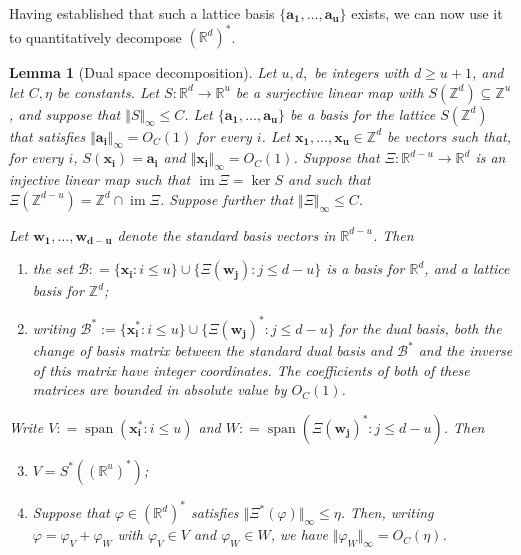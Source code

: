 \documentclass[12pt,a4paper,twoside,reqno]{amsart}
\newtheorem{Lemma}[Theorem]{Lemma}
\newcommand{\spn}{\operatorname{span}}
\newcommand{\im}{\operatorname{im}}
\numberwithin{equation}{section}
\begin{document}
Having established that such a lattice basis $\{\mathbf{a_1},\dots,\mathbf{a_u}\}$ exists, we can now use it to quantitatively decompose $(\mathbb{R}^d)^*$. 
\begin{Lemma}[Dual space decomposition]
\label{Lemma dual space decomposition}
Let $u,d,$ be integers with $d\geqslant u+1$, and let $C,\eta$ be constants. Let $S:\mathbb{R}^d \longrightarrow \mathbb{R}^u$ be a surjective linear map with $S(\mathbb{Z}^d) \subseteq \mathbb{Z}^u$, and suppose that $\Vert S\Vert_\infty \leqslant C$. Let $\{\mathbf{a_1},\dots,\mathbf{a_u}\}$ be a basis for the lattice $S(\mathbb{Z}^d)$ that satisfies $\Vert \mathbf{a_i}\Vert_\infty = O_{C}(1)$ for every $i$. Let $\mathbf{x_1},\dots,\mathbf{x_u}\in\mathbb{Z}^d$ be vectors such that, for every $i$, $S(\mathbf{x_i}) = \mathbf{a_i}$ and $\Vert \mathbf{x_i}\Vert_\infty = O_{C}(1)$. Suppose that $\Xi:\mathbb{R}^{d-u}\longrightarrow \mathbb{R}^d$ is an injective linear map such that $\im \Xi = \ker S$ and such that $\Xi(\mathbb{Z}^{d-u}) = \mathbb{Z}^d \cap\im \Xi$. Suppose further that $\Vert \Xi\Vert_\infty \leqslant C$. 

Let $\mathbf{w_1},\dots,\mathbf{w_{d-u}}$ denote the standard basis vectors in $\mathbb{R}^{d-u}$. Then 
\begin{enumerate}[(1)]
\item the set $\mathcal{B}: = \{ \mathbf{x_i}: i\leqslant u\} \cup \{\Xi(\mathbf{w_j}): j\leqslant d-u\}$ is a basis for $\mathbb{R}^d$, and a lattice basis for $\mathbb{Z}^d$;
\item writing $\mathcal{B}^* := \{ \mathbf{x_i^*}: i\leqslant u\} \cup \{\Xi(\mathbf{w_j})^*: j\leqslant d-u\}$ for the dual basis, both the change of basis matrix between the standard dual basis and $\mathcal{B}^*$ and the inverse of this matrix have integer coordinates. The coefficients of both of these matrices are bounded in absolute value by $O_{C}(1)$.
\end{enumerate}

\noindent  Write $V: = \spn(\mathbf{x_i^*}: i\leqslant u)$ and $W: = \spn(\Xi(\mathbf{w_j})^*: j\leqslant d-u)$. Then

\begin{enumerate}[(1)]
\setcounter{enumi}{2}
\item $V = S^*((\mathbb{R}^u)^*)$;
\item Suppose that $\varphi \in (\mathbb{R}^d)^*$ satisfies $\Vert \Xi^*(\varphi)\Vert_\infty \leqslant \eta$. Then, writing $\varphi = \varphi_V + \varphi_W$ with $\varphi_V \in V$ and $\varphi_W \in W$, we have $\Vert \varphi_W\Vert_\infty = O_C(\eta)$. 
\end{enumerate} 

 

\end{Lemma}
\end{document}
